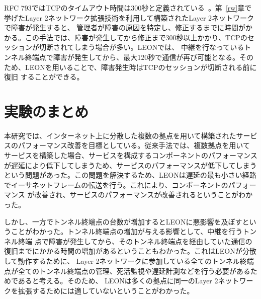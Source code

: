 RFC 793ではTCPのタイムアウト時間は300秒と定義されている~\cite{rfc:tcp}。第~\ref{rw}章で挙げたLayer 2ネットワーク拡張技術を利用して構築されたLayer 2ネットワークで障害が発生すると、
管理者が障害の原因を特定し、修正するまでに時間がかかる。この手法では、障害が発生してから修正まで300秒以上かかり、TCPのセッションが切断されてしまう場合が多い。LEONでは、
中継を行なっているトンネル終端点で障害が発生してから、最大120秒で通信が再び可能となる。そのため、LEONを用いることで、障害発生時はTCPのセッションが切断される前に復旧
することができる。

\section{実験のまとめ}

本研究では、インターネット上に分散した複数の拠点を用いて構築されたサービスのパフォーマンス改善を目標としている。従来手法では、複数拠点を用いて
サービスを構築した場合、サービスを構成するコンポーネントのパフォーマンスが遅延により低下してしまうため、サービスのパフォーマンスが低下してしまう
という問題があった。この問題を解決するため、LEONは遅延の最も小さい経路でイーサネットフレームの転送を行う。これにより、コンポーネントのパフォーマンス
が改善され、サービスのパフォーマンスが改善されるということがわかった。

しかし、一方でトンネル終端点の台数が増加するとLEONに悪影響を及ぼすということがわかった。トンネル終端点の増加が与える影響として、中継を行うトンネル終端
点で障害が発生してから、そのトンネル終端点を経由していた通信の復旧までにかかる時間の増加があるということもわかった。これはLEONが分散して動作するために、
Layer 2ネットワークに参加している全てのトンネル終端点が全てのトンネル終端点の管理、死活監視や遅延計測などを行う必要があるためであると考える。そのため、
LEONは多くの拠点に同一のLayer 2ネットワークを拡張するためには適していないということがわかった。

